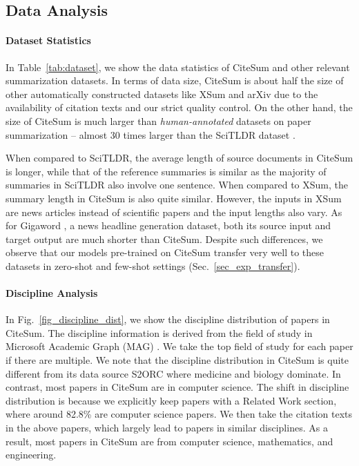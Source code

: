 \documentclass[11pt]{article}
\newcommand{\ourdata}{CiteSum\xspace}
\begin{document}
\subsection{Data Analysis}

\paragraph{Dataset Statistics}



In Table~\ref{tab:dataset}, we show the data statistics of \ourdata and other relevant summarization datasets.
In terms of data size, \ourdata is about half the size of other automatically constructed datasets like XSum \cite{narayan-etal-2018-dont} and arXiv \cite{cohan-etal-2018-discourse} due to the availability of citation texts and our strict quality control.
On the other hand, the size of \ourdata is much larger than \textit{human-annotated} datasets on paper summarization \cite{yasunaga2019scisummnet,cachola-etal-2020-tldr} -- almost 30 times larger than the SciTLDR dataset \cite{cachola-etal-2020-tldr}.

When compared to SciTLDR, the average length of source documents in \ourdata is longer, while that of the reference summaries is similar as the majority of summaries in SciTLDR also involve one sentence.
When compared to XSum, the summary length in \ourdata is also quite similar.
However, the inputs in XSum are news articles instead of scientific papers and the input lengths also vary.
As for Gigaword \cite{rush-etal-2015-neural}, a news headline generation dataset, both its source input and target output are much shorter than \ourdata.
Despite such differences, we observe that our models pre-trained on \ourdata transfer very well to these datasets in zero-shot and few-shot settings (Sec.~\ref{sec_exp_transfer}).



\paragraph{Discipline Analysis}
In Fig.~\ref{fig_discipline_dist}, we show the discipline distribution of papers in \ourdata.
The discipline information is derived from the field of study in Microsoft Academic Graph (MAG) \cite{shen-etal-2018-web}.
We take the top field of study for each paper if there are multiple.
We note that the discipline distribution in \ourdata is quite different from its data source S2ORC \cite{lo-etal-2020-s2orc} where medicine and biology dominate.
In contrast, most papers in \ourdata are in computer science.
The shift in discipline distribution is because we explicitly keep papers with a Related Work section, where around 82.8\% are computer science papers.
We then take the citation texts in the above papers, which largely lead to papers in similar disciplines.
As a result, most papers in \ourdata are from computer science, mathematics, and engineering.
\end{document}
